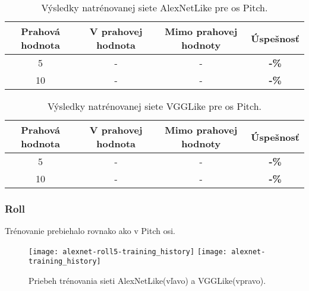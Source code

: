 \begin{table}[H]
    \centering
    \begin{tabular}{|c|c|c|c|}
        \hline
        Prahová hodnota & V prahovej hodnota       & Mimo prahovej hodnoty    & Úspešnosť    \\ \hline
        5               & {\color[HTML]{009901} -} & {\color[HTML]{9A0000} -} & \textbf{-\%} \\ \hline
        10              & {\color[HTML]{009901} -} & {\color[HTML]{9A0000} -} & \textbf{-\%} \\ \hline
    \end{tabular}
    \caption{Výsledky natrénovanej siete AlexNetLike pre os Pitch.}
    \label{tab:alexnetpitchresults}
\end{table}
\begin{table}[H]
    \centering
    \begin{tabular}{|c|c|c|c|}
        \hline
        Prahová hodnota & V prahovej hodnota       & Mimo prahovej hodnoty    & Úspešnosť    \\ \hline
        5               & {\color[HTML]{009901} -} & {\color[HTML]{9A0000} -} & \textbf{-\%} \\ \hline
        10              & {\color[HTML]{009901} -} & {\color[HTML]{9A0000} -} & \textbf{-\%} \\ \hline
    \end{tabular}
    \caption{Výsledky natrénovanej siete VGGLike pre os Pitch.}
    \label{tab:vgglikepitchresults}
\end{table}


\subsubsection{Roll}
Trénovanie prebiehalo rovnako ako v Pitch osi.

\begin{figure}[H]
    \centering
    \texttt{[image: alexnet-roll5-training\_history]} %
	\texttt{[image: alexnet-training\_history]} %
	\caption{Priebeh trénovania sieti AlexNetLike(vľavo) a VGGLike(vpravo).}
	\label{pic:rollaxis}
\end{figure}

